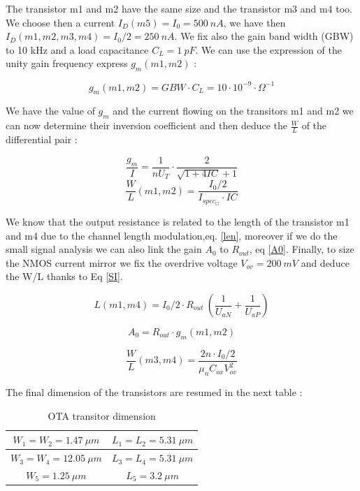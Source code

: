 \documentclass[11pt,a4paper]{report}
\begin{document}
The transistor m1 and m2 have the same size and the transistor m3 and m4 too.
We choose then a current $I_D(m5)= I_0 = 500~nA$, we have then $I_D(m1,m2,m3,m4)= I_0/2 =250~nA$. We fix also the gain band width (GBW) to 10 kHz and a load capacitance $C_L = 1~pF$. We can use the expression of the unity gain frequency express $g_m(m1,m2)$ :

\begin{equation}
  g_m(m1,m2) = GBW\cdot C_L = 10\cdot10^{-9} \cdot \Omega^{-1}
  \end{equation}   

We have the value of $g_m$ and the current flowing on the transitors m1 and m2 we can now determine their inversion coefficient and then deduce the $\frac{W}{L}$ of the differential pair :

\begin{equation}
  \frac{g_m}{I} = \frac{1}{n U_T} \cdot \frac{2}{ \sqrt{1+4IC} +1 }
\end{equation}
\begin{equation}
  \frac{W}{L}(m1,m2) = \frac{I_0/2}{I_{spec_{\Box}}\cdot IC}
\end{equation}

We know that the output resistance is related to the length of the transistor m1 and m4 due to the channel length modulation,eq. \ref{len}, moreover if we do the small signal analysis we can also link the gain $A_0$ to $R_{out}$, eq \ref{A0}. Finally, to size the NMOS current mirror we fix the overdrive voltage $V_{ov} = 200~mV$ and deduce the W/L thanks to Eq \ref{SI}. 


\begin{equation}
  L(m1,m4) = I_0/2 \cdot R_{out}~\left(\frac{1}{U_{aN}}+\frac{1}{U_{aP}}\right)
  \label{len}
\end{equation}

\begin{equation}
  A_0 = R_{out}\cdot g_m(m1,m2) 
  \label{A0}
\end{equation}

\begin{equation}
  \frac{W}{L}(m3, m4) = \frac{ 2n \cdot I_0/2}{\mu_n C_{ox} V_{ov}^2}
  \label{SI}
\end{equation}

\newpage

The final dimension of the transistors are resumed in the next table :

\begin{table}[h]
  \begin{center}
  \begin{tabular}{|c|c|}\hline
    $W_1 = W_2 = 1.47 ~\mu m$ & $L_1 = L_2 = 5.31 ~\mu m$  \\ \hline
    $W_3 = W_4 = 12.05 ~\mu m$ & $L_3 = L_4 = 5.31 ~\mu m$ \\ \hline
    $W_5 = 1.25 ~ \mu m$       & $L_5 = 3.2~\mu m$ \\ \hline
  \end{tabular}
\end{center}
\caption{OTA transitor dimension}
\end{table}
\end{document}
